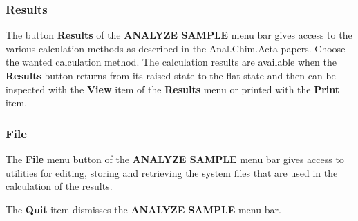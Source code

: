 \subsubsection{Results}
The button {\bf Results} of the {\bf ANALYZE SAMPLE} menu bar gives access
to the various calculation methods as described in the Anal.Chim.Acta papers.
Choose the wanted calculation
method. The calculation results are available when the {\bf Results}
button returns from its raised state to the flat state and then can
be inspected with the {\bf View} item of the {\bf Results} menu
or printed with the {\bf Print} item.

\subsubsection{File}
The {\bf File} menu button of the {\bf ANALYZE SAMPLE} menu bar
gives access to  utilities for editing, storing and retrieving
the system files that are used in the calculation of the results.

The {\bf Quit} item dismisses the {\bf ANALYZE SAMPLE} menu bar.
 

 



